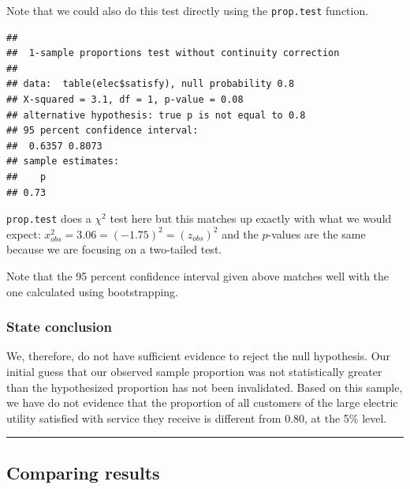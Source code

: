 \documentclass[]{tufte-book}
\newenvironment{Shaded}{\begin{snugshade}}{\end{snugshade}}
\newcommand{\KeywordTok}[1]{\textcolor[rgb]{0.13,0.29,0.53}{\textbf{{#1}}}}
\newcommand{\DataTypeTok}[1]{\textcolor[rgb]{0.13,0.29,0.53}{{#1}}}
\newcommand{\FloatTok}[1]{\textcolor[rgb]{0.00,0.00,0.81}{{#1}}}
\newcommand{\StringTok}[1]{\textcolor[rgb]{0.31,0.60,0.02}{{#1}}}
\newcommand{\OtherTok}[1]{\textcolor[rgb]{0.56,0.35,0.01}{{#1}}}
\newcommand{\NormalTok}[1]{{#1}}
\let\oldrule=\rule
\renewcommand{\rule}[1]{\oldrule{\linewidth}}
\theoremstyle{definition}
\theoremstyle{definition}
\theoremstyle{remark}
\begin{document}
Note that we could also do this test directly using the
\texttt{prop.test} function.

\begin{Shaded}
\end{Shaded}

\begin{verbatim}
## 
##  1-sample proportions test without continuity correction
## 
## data:  table(elec$satisfy), null probability 0.8
## X-squared = 3.1, df = 1, p-value = 0.08
## alternative hypothesis: true p is not equal to 0.8
## 95 percent confidence interval:
##  0.6357 0.8073
## sample estimates:
##    p 
## 0.73
\end{verbatim}

\texttt{prop.test} does a \(\chi^2\) test here but this matches up
exactly with what we would expect:
\(x^2_{obs} = 3.06 = (-1.75)^2 = (z_{obs})^2\) and the \(p\)-values are
the same because we are focusing on a two-tailed test.

Note that the 95 percent confidence interval given above matches well
with the one calculated using bootstrapping.

\subsubsection{State conclusion}\label{state-conclusion-1}

We, therefore, do not have sufficient evidence to reject the null
hypothesis. Our initial guess that our observed sample proportion was
not statistically greater than the hypothesized proportion has not been
invalidated. Based on this sample, we have do not evidence that the
proportion of all customers of the large electric utility satisfied with
service they receive is different from 0.80, at the 5\% level.

\begin{center}\rule{0.5\linewidth}{\linethickness}\end{center}

\subsection{Comparing results}\label{comparing-results-1}
\end{document}
